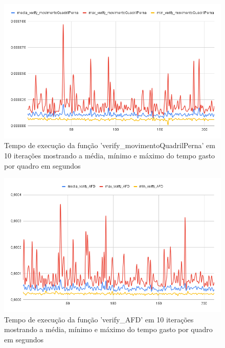 \begin{figure}[H]
	\centering
	\caption{Tempo de execução da função 'verify\_movimentoQuadrilPerna' em 10 iterações mostrando a média, mínimo e máximo do tempo gasto por quadro em segundos}
	\includegraphics[scale=0.55]{figuras/grafico/movimentoQuadril.png}
\end{figure}


\begin{figure}[H]
	\centering
	\caption{Tempo de execução da função 'verify\_AFD' em 10 iterações mostrando a média, mínimo e máximo do tempo gasto por quadro em segundos}
	\includegraphics[scale=0.55]{figuras/grafico/verify_AFD.png}
\end{figure}


